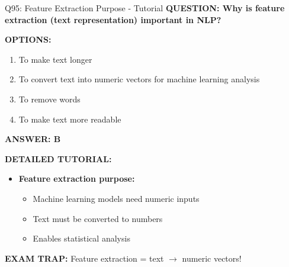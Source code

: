 \documentclass[8pt]{beamer}
\begin{document}
	\begin{frame}{Q95: Feature Extraction Purpose - Tutorial}
		\fontsize{6.5}{7.5}\selectfont
		\textbf{QUESTION: Why is feature extraction (text representation) important in NLP?}
		
		\vspace{0.1cm}
		\textbf{OPTIONS:}
		\begin{enumerate}
			\item To make text longer
			\item To convert text into numeric vectors for machine learning analysis
			\item To remove words
			\item To make text more readable
		\end{enumerate}
		
		\vspace{0.1cm}
		\textcolor{myblue}{\textbf{ANSWER: B}}
		
		\vspace{0.1cm}
		\textbf{DETAILED TUTORIAL:}
		\begin{itemize}
			\item \textbf{Feature extraction purpose:}
			\begin{itemize}
				\item Machine learning models need numeric inputs
				\item Text must be converted to numbers
				\item Enables statistical analysis
			\end{itemize}
		\end{itemize}
		
		\textcolor{myred}{\textbf{EXAM TRAP:}} Feature extraction = \textcolor{myblue}{text $\to$ numeric vectors}!
	\end{frame}
	
\end{document}
